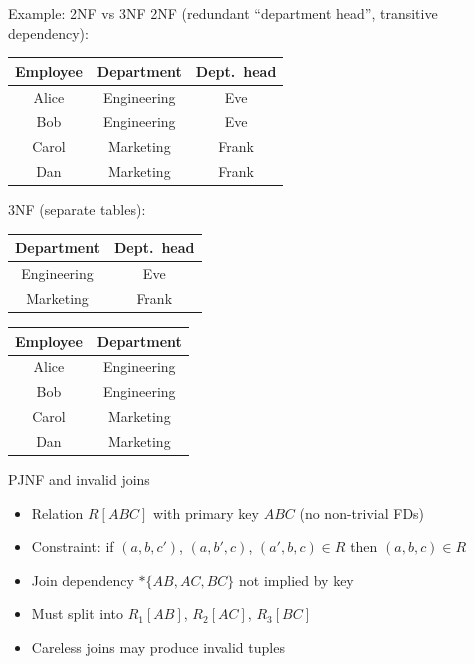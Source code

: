 \begin{frame}{Example: 2NF vs 3NF}
  2NF (redundant ``department head'', transitive dependency):

  \centering
  \small
  \begin{tabular}{ccc}
    \toprule
    \textbf{Employee} & \textbf{Department} & \textbf{Dept.\ head} \\
    \midrule
    Alice & Engineering & Eve \\
    Bob & Engineering & Eve \\
    Carol & Marketing & Frank \\
    Dan & Marketing & Frank \\
    \bottomrule
  \end{tabular}

  \vspace{0.4cm}
  \raggedright
  3NF (separate tables):

  \centering
  \begin{tabular}{cc}
    \toprule
    \textbf{Department} & \textbf{Dept.\ head} \\
    \midrule
    Engineering & Eve \\
    Marketing & Frank \\
    \bottomrule
  \end{tabular}
  \quad
  \begin{tabular}{cc}
    \toprule
    \textbf{Employee} & \textbf{Department} \\
    \midrule
    Alice & Engineering \\
    Bob & Engineering \\
    Carol & Marketing \\
    Dan & Marketing \\
    \bottomrule
  \end{tabular}
\end{frame}

\begin{frame}{PJNF and invalid joins}
  \begin{itemize}
    \item Relation $R[ABC]$ with primary key $ABC$ (no non-trivial FDs)
    \item Constraint: if $(a,b,c')$, $(a,b',c)$, $(a',b,c) \in R$
      then $(a,b,c) \in R$
    \item Join dependency $*\{AB, AC, BC\}$ not implied by key
    \item Must split into $R_1[AB]$, $R_2[AC]$, $R_3[BC]$
    \item Careless joins may produce invalid tuples
  \end{itemize}
\end{frame}


